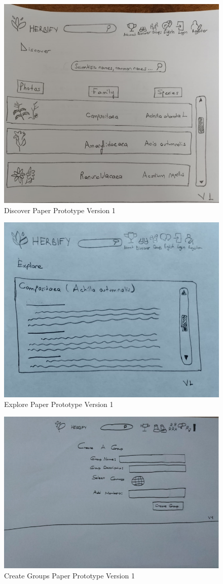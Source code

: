 \documentclass[conference]{IEEEtran}
\begin{document}
\begin{figure}[H]
\centerline{\includegraphics[width=0.48 \textwidth]{images/discover-pp1.png}}
\caption{Discover Paper Prototype Version 1}
\label{fig:graph1}
\end{figure}


\begin{figure}[H]
\centerline{\includegraphics[width=0.48 \textwidth]{images/explore-pp1.png}}
\caption{Explore Paper Prototype Version 1}
\label{fig:graph1}
\end{figure}

\begin{figure}[H]
\centerline{\includegraphics[width=0.48 \textwidth]{images/creategroups-pp1.png}}
\caption{Create Groups Paper Prototype Version 1}
\label{fig:graph1}
\end{figure}
\end{document}
